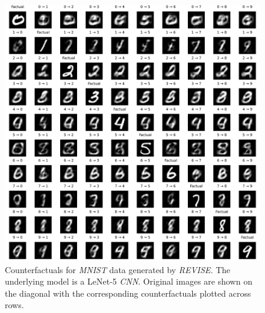 \begin{figure}
  \centering
  \includegraphics[width=1.0\linewidth]{../www/mnist_all_lenet_revise.png}
  \caption{Counterfactuals for \textit{MNIST} data generated by \textit{REVISE}. The underlying model is a LeNet-5 \textit{CNN}. Original images are shown on the diagonal with the corresponding counterfactuals plotted across rows.}\label{fig:mnist-revise-lenet}
\end{figure}


